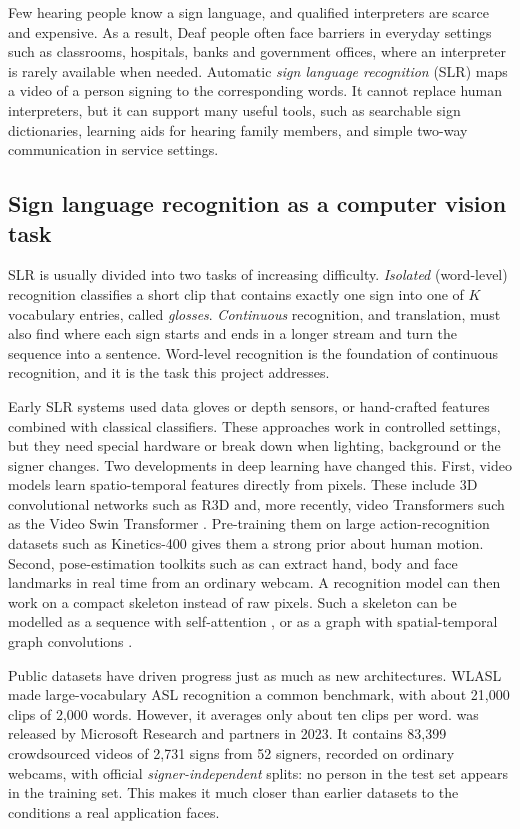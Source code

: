 Few hearing people know a sign language, and qualified interpreters are
scarce and expensive. As a result, Deaf people often face barriers in
everyday settings such as classrooms, hospitals, banks and government
offices, where an interpreter is rarely available when needed. Automatic
\emph{sign language recognition} (SLR) maps a video of a person signing to
the corresponding words. It cannot replace human interpreters, but it can
support many useful tools, such as searchable sign dictionaries, learning
aids for hearing family members, and simple two-way communication in
service settings.

\subsection{Sign language recognition as a computer vision task}

SLR is usually divided into two tasks of increasing difficulty.
\emph{Isolated} (word-level) recognition classifies a short clip that
contains exactly one sign into one of $K$ vocabulary entries, called
\emph{glosses}. \emph{Continuous} recognition, and translation, must also
find where each sign starts and ends in a longer stream and turn the
sequence into a sentence. Word-level recognition is the foundation of
continuous recognition, and it is the task this project addresses.

Early SLR systems used data gloves or depth sensors, or hand-crafted
features combined with classical classifiers. These approaches work in
controlled settings, but they need special hardware or break down when
lighting, background or the signer changes. Two developments in deep
learning have changed this. First, video models learn spatio-temporal
features directly from pixels. These include 3D convolutional networks
such as R3D \cite{tran2018closer} and, more recently, video Transformers
such as the Video Swin Transformer \cite{liu2022videoswin}. Pre-training
them on large action-recognition datasets such as Kinetics-400
\cite{kay2017kinetics} gives them a strong prior about human motion.
Second, pose-estimation toolkits such as \mediapipe{}
\cite{lugaresi2019mediapipe} can extract hand, body and face landmarks in
real time from an ordinary webcam. A recognition model can then work on a
compact skeleton instead of raw pixels. Such a skeleton can be modelled
as a sequence with self-attention \cite{vaswani2017attention}, or as a
graph with spatial-temporal graph convolutions \cite{yan2018stgcn}.

Public datasets have driven progress just as much as new architectures.
WLASL \cite{li2020wlasl} made large-vocabulary ASL recognition a common
benchmark, with about 21,000 clips of 2,000 words. However, it averages
only about ten clips per word. \aslc{} \cite{desai2023aslcitizen} was
released by Microsoft Research and partners in 2023. It contains 83,399
crowdsourced videos of 2,731 signs from 52 signers, recorded on ordinary
webcams, with official \emph{signer-independent} splits: no person in the
test set appears in the training set. This makes it much closer than
earlier datasets to the conditions a real application faces.

